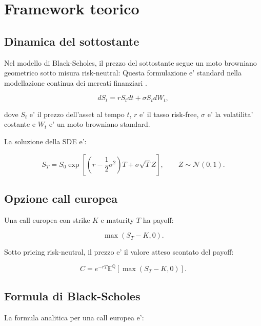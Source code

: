 \section{Framework teorico}

\subsection{Dinamica del sottostante}

Nel modello di Black-Scholes, il prezzo del sottostante segue un moto browniano geometrico sotto misura risk-neutral:
Questa formulazione e' standard nella modellazione continua dei mercati finanziari \cite{shreve2004stochastic}.

\begin{equation}
    dS_t = r S_t dt + \sigma S_t dW_t,
\end{equation}

dove $S_t$ e' il prezzo dell'asset al tempo $t$, $r$ e' il tasso risk-free, $\sigma$ e' la volatilita' costante e $W_t$ e' un moto browniano standard.

La soluzione della SDE e':

\begin{equation}
    S_T = S_0 \exp\left[\left(r - \frac{1}{2}\sigma^2\right)T + \sigma \sqrt{T} Z\right],
    \qquad Z \sim \mathcal{N}(0,1).
\end{equation}

\subsection{Opzione call europea}

Una call europea con strike $K$ e maturity $T$ ha payoff:

\begin{equation}
    \max(S_T - K, 0).
\end{equation}

Sotto pricing risk-neutral, il prezzo e' il valore atteso scontato del payoff:

\begin{equation}
    C = e^{-rT}\mathbb{E}^{\mathbb{Q}}\left[\max(S_T - K, 0)\right].
\end{equation}

\subsection{Formula di Black-Scholes}

La formula analitica per una call europea e':

